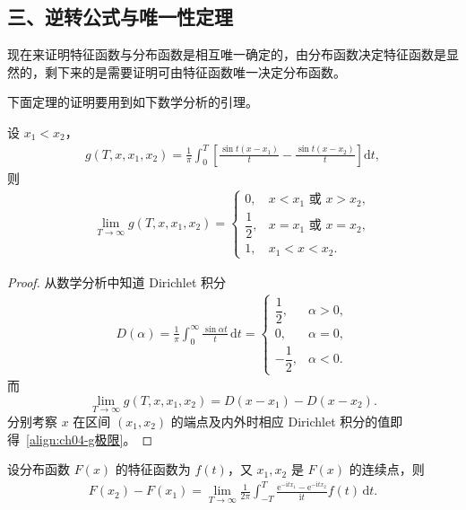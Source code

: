 \documentclass[../../main.tex]{subfiles}
\begin{document}
\subsection*{三、逆转公式与唯一性定理}

现在来证明特征函数与分布函数是相互唯一确定的，由分布函数决定特征函数是显然的，剩下来的是需要证明可由特征函数唯一决定分布函数。

下面定理的证明要用到如下数学分析的引理。

\begin{lemma}[Dirichlet 积分]\label{lemma:ch04-Dirichlet积分}
设 $x_1<x_2$，
\begin{align}
g(T,x,x_1,x_2)=\frac{1}{\pi}\int_0^T\left[\frac{\sin t(x-x_1)}{t}-\frac{\sin t(x-x_2)}{t}\right]\mathrm{d}t,\label{align:ch04-g函数}
\end{align}
则
\begin{align}
\lim_{T\to\infty}g(T,x,x_1,x_2)=
\begin{cases}
0,&x<x_1\text{ 或 }x>x_2,\\
\dfrac12,&x=x_1\text{ 或 }x=x_2,\\
1,&x_1<x<x_2.
\end{cases}\label{align:ch04-g极限}
\end{align}
\end{lemma}

\begin{proof}
从数学分析中知道 Dirichlet 积分
\begin{align}
D(\alpha)=\frac{1}{\pi}\int_0^{\infty}\frac{\sin\alpha t}{t}\,\mathrm{d}t=
\begin{cases}
\dfrac12,&\alpha>0,\\
0,&\alpha=0,\\
-\dfrac12,&\alpha<0.
\end{cases}\label{align:ch04-Dirichlet}
\end{align}
而
\[
\lim_{T\to\infty}g(T,x,x_1,x_2)=D(x-x_1)-D(x-x_2).
\]
分别考察 $x$ 在区间 $(x_1,x_2)$ 的端点及内外时相应 Dirichlet 积分的值即得~\eqref{align:ch04-g极限}。
\end{proof}

\begin{theorem}[逆转公式]\label{theorem:ch04-逆转公式}
设分布函数 $F(x)$ 的特征函数为 $f(t)$，又 $x_1,x_2$ 是 $F(x)$ 的连续点，则
\begin{align}
F(x_2)-F(x_1)=\lim_{T\to\infty}\frac{1}{2\pi}\int_{-T}^T\frac{\mathrm{e}^{-\mathrm{i}tx_1}-\mathrm{e}^{-\mathrm{i}tx_2}}{\mathrm{i}t}f(t)\,\mathrm{d}t.\label{align:ch04-逆转公式}
\end{align}
\end{theorem}
\end{document}
